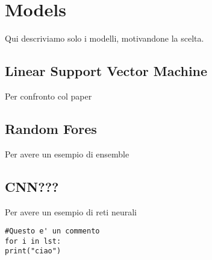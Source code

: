 
\section{Models}

Qui descriviamo solo i modelli, motivandone la scelta.

\subsection{Linear Support Vector Machine}
Per confronto col paper

\subsection{Random Fores}
Per avere un esempio di ensemble

\subsection{CNN???}
Per avere un esempio di reti neurali

\begin{lstlisting}
#Questo e' un commento
for i in lst:
print("ciao")
\end{lstlisting}
